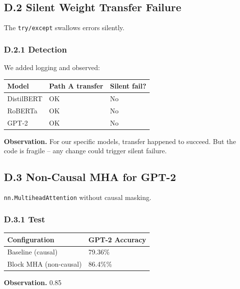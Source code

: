 \subsection{D.2 Silent Weight Transfer Failure}

The \texttt{try/except} swallows errors silently.

\subsubsection{D.2.1 Detection}

We added logging and observed:

\begin{table}[H]
\centering
\small
\begin{tabular}{lll}
\toprule
\textbf{Model} & \textbf{Path A transfer} & \textbf{Silent fail?} \\
\midrule
DistilBERT & OK & No \\
RoBERTa & OK & No \\
GPT-2 & OK & No \\
\bottomrule
\end{tabular}
\end{table}

\textbf{Observation.} For our specific models, transfer happened to succeed. But 
the code is fragile -- any change could trigger silent failure.

\subsection{D.3 Non-Causal MHA for GPT-2}

\texttt{nn.MultiheadAttention} without causal masking.

\subsubsection{D.3.1 Test}

\begin{table}[H]
\centering
\small
\begin{tabular}{ll}
\toprule
\textbf{Configuration} & \textbf{GPT-2 Accuracy} \\
\midrule
Baseline (causal) & 79.36\% \\
Block MHA (non-causal) & 86.4\%\% \\
\bottomrule
\end{tabular}
\end{table}

\textbf{Observation.} 0.85

